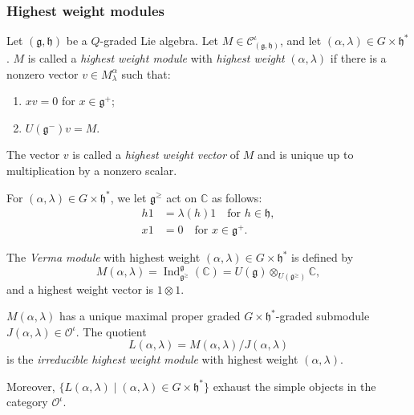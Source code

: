\documentclass{beamer}
\DeclareMathOperator{\Ind}{Ind}
\begin{document}
\begin{frame}
  \frametitle{Highest weight modules}
  Let $(\mathfrak{g}, \mathfrak{h})$ be a $Q$-graded Lie algebra.
  Let $M \in \mathcal{C}^{\iota}_{(\mathfrak{g}, \mathfrak{h})}$, and let $(\alpha, \lambda) \in G \times \mathfrak{h}^*$.
  $M$ is called a \emph{highest weight module} with \emph{highest weight} $(\alpha, \lambda)$ if there is a nonzero vector $v \in M^{\alpha}_{\lambda}$ such that:
  \begin{enumerate}
  \item $xv = 0$ for $x \in \mathfrak{g}^+$;
  \item $U(\mathfrak{g}^-)v = M$.
  \end{enumerate}
  The vector $v$ is called a \emph{highest weight vector} of $M$ and is unique up to multiplication by a nonzero scalar.

  For $(\alpha, \lambda) \in G \times \mathfrak{h}^*$, we let $\mathfrak{g}^{\ge}$ act on $\mathbb{C}$ as follows:
  \begin{align*}
    h1 &= \lambda(h)1 \quad \text{for $h \in \mathfrak{h}$}, \\
    x1 &= 0 \quad \text{for $x \in \mathfrak{g}^+$}.
  \end{align*}

  The \emph{Verma module} with highest weight $(\alpha, \lambda) \in G \times \mathfrak{h}^*$ is defined by
  \begin{equation*}
    M(\alpha, \lambda) = \Ind^{\mathfrak{g}}_{\mathfrak{g}^{\ge}}(\mathbb{C}) = U(\mathfrak{g}) \otimes_{U(\mathfrak{g}^{\ge})} \mathbb{C},
  \end{equation*}
  and a highest weight vector is $1\otimes1$.
\end{frame}

\begin{frame}
  $M(\alpha, \lambda)$ has a unique maximal proper graded $G \times \mathfrak{h}^*$-graded submodule $J(\alpha, \lambda) \in \mathcal{O}^{\iota}$.
  The quotient
  \begin{equation*}
    L(\alpha, \lambda) = M(\alpha, \lambda)/J(\alpha, \lambda)
  \end{equation*}
  is the \emph{irreducible highest weight module} with highest weight $(\alpha, \lambda)$.

  Moreover, $\{L(\alpha, \lambda) \mid (\alpha, \lambda) \in G \times \mathfrak{h}^*\}$ exhaust the simple objects in the category $\mathcal{O}^{\iota}$.
\end{frame}
\end{document}

